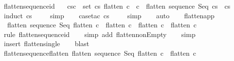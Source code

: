 \begin{isabellebody}
%
\isadelimproof
\isanewline
%
\endisadelimproof
\isanewline
\isanewline
{}\isamarkupfalse%
\ flatten{\isacharunderscore}sequence{\isacharunderscore}id{\isacharcolon}\ \isanewline
\ \ {\isachardoublequoteopen}{\isasymlbrakk}cs{\isasymnoteq}{\isacharbrackleft}{\isacharbrackright}{\isacharsemicolon}{\isasymforall}c\ {\isasymin}\ set\ cs{\isachardot}\ flatten\ c\ {\isacharequal}\ {\isacharbrackleft}c{\isacharbrackright}{\isasymrbrakk}\ {\isasymLongrightarrow}\ flatten\ {\isacharparenleft}sequence\ Seq\ cs{\isacharparenright}\ {\isacharequal}\ cs{\isachardoublequoteclose}\isanewline
%
\isadelimproof
\ \ %
\endisadelimproof
%
\isatagproof
{}\isamarkupfalse%
\ {\isacharparenleft}induct\ cs{\isacharparenright}\isanewline
\ \ \isamarkupfalse%
\ \ simp\isanewline
\ \ \isamarkupfalse%
\ {\isacharparenleft}case{\isacharunderscore}tac\ cs{\isacharparenright}\isanewline
\ \ \isamarkupfalse%
\ \ simp\isanewline
\ \ \isamarkupfalse%
\ auto\isanewline
\ \ \isamarkupfalse%
%
\endisatagproof
{\isafoldproof}%
%
\isadelimproof
\isanewline
%
\endisadelimproof
\isanewline
\isanewline
{}\isamarkupfalse%
\ flatten{\isacharunderscore}app{\isacharcolon}\isanewline
\ \ {\isachardoublequoteopen}flatten\ {\isacharparenleft}sequence\ Seq\ {\isacharparenleft}flatten\ c{}\ {\isacharat}\ flatten\ c{}{\isacharparenright}{\isacharparenright}\ {\isacharequal}\ flatten\ c{}\ {\isacharat}\ flatten\ c{}{\isachardoublequoteclose}\isanewline
%
\isadelimproof
\ \ %
\endisadelimproof
%
\isatagproof
{}\isamarkupfalse%
\ {\isacharparenleft}rule\ flatten{\isacharunderscore}sequence{\isacharunderscore}id{\isacharparenright}\isanewline
\ \ \isamarkupfalse%
\ {\isacharparenleft}simp\ add{\isacharcolon}\ flatten{\isacharunderscore}nonEmpty{\isacharparenright}\isanewline
\ \ \isamarkupfalse%
\ {\isacharparenleft}simp{\isacharparenright}\isanewline
\ \ \isamarkupfalse%
\ {\isacharparenleft}insert\ flatten{\isacharunderscore}single{\isacharparenright}\isanewline
\ \ \isamarkupfalse%
\ blast\isanewline
\ \ \isamarkupfalse%
%
\endisatagproof
{\isafoldproof}%
%
\isadelimproof
\isanewline
%
\endisadelimproof
\isanewline
\isanewline
\ \ \isanewline
{}\isamarkupfalse%
\ flatten{\isacharunderscore}sequence{\isacharunderscore}flatten{\isacharcolon}\ {\isachardoublequoteopen}flatten\ {\isacharparenleft}sequence\ Seq\ {\isacharparenleft}flatten\ c{\isacharparenright}{\isacharparenright}\ {\isacharequal}\ flatten\ c{\isachardoublequoteclose}\isanewline

\end{isabellebody}
